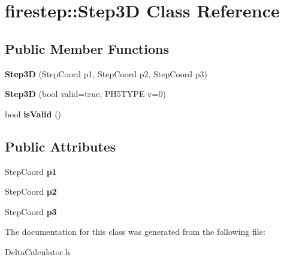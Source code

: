 \hypertarget{classfirestep_1_1_step3_d}{\section{firestep\+:\+:Step3\+D Class Reference}
\label{classfirestep_1_1_step3_d}
}
\subsection*{Public Member Functions}
\begin{DoxyCompactItemize}
\item 
\hypertarget{classfirestep_1_1_step3_d_a71a9267b8090cfd3be24eac48cbd72c1}{{\bfseries Step3\+D} (Step\+Coord p1, Step\+Coord p2, Step\+Coord p3)}\label{classfirestep_1_1_step3_d_a71a9267b8090cfd3be24eac48cbd72c1}

\item 
\hypertarget{classfirestep_1_1_step3_d_abb6f8e9b005c6af8271932d4900a3f0d}{{\bfseries Step3\+D} (bool valid=true, P\+H5\+T\+Y\+P\+E v=0)}\label{classfirestep_1_1_step3_d_abb6f8e9b005c6af8271932d4900a3f0d}

\item 
\hypertarget{classfirestep_1_1_step3_d_a6e926d3e20c3346bafebe9256c7e7337}{bool {\bfseries is\+Valid} ()}\label{classfirestep_1_1_step3_d_a6e926d3e20c3346bafebe9256c7e7337}

\end{DoxyCompactItemize}
\subsection*{Public Attributes}
\begin{DoxyCompactItemize}
\item 
\hypertarget{classfirestep_1_1_step3_d_aac4c0122b81ece8098628efd4e27f51e}{Step\+Coord {\bfseries p1}}\label{classfirestep_1_1_step3_d_aac4c0122b81ece8098628efd4e27f51e}

\item 
\hypertarget{classfirestep_1_1_step3_d_a7276a68e8df0e465524f5a0042c993b4}{Step\+Coord {\bfseries p2}}\label{classfirestep_1_1_step3_d_a7276a68e8df0e465524f5a0042c993b4}

\item 
\hypertarget{classfirestep_1_1_step3_d_aaba7eeabe390843f766607ffb3be067a}{Step\+Coord {\bfseries p3}}\label{classfirestep_1_1_step3_d_aaba7eeabe390843f766607ffb3be067a}

\end{DoxyCompactItemize}


The documentation for this class was generated from the following file\+:\begin{DoxyCompactItemize}
\item 
Delta\+Calculator.\+h\end{DoxyCompactItemize}

